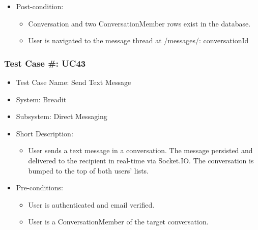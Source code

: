 \begin{itemize}
  \item Post-condition:
\begin{itemize}
  \item Conversation and two ConversationMember rows exist in the database.
  \item User is navigated to the message thread at /messages/: conversationId
\end{itemize}
\end{itemize}

\subsubsection{Test Case \#: UC43}
\begin{itemize}
  \item Test Case Name: Send Text Message
  \item System: Breadit
  \item Subsystem: Direct Messaging
  \item Short Description:
\begin{itemize}
  \item User sends a text message in a conversation. The message persisted and delivered to the recipient in real-time via Socket.IO. The conversation is bumped to the top of both users' lists.
\end{itemize}
  \item Pre-conditions:
\begin{itemize}
  \item User is authenticated and email verified.
  \item User is a ConversationMember of the target conversation.
\end{itemize}
\end{itemize}

